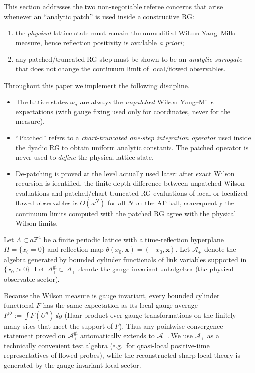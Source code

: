 \label{sec:patching}

This section addresses the two non-negotiable referee concerns that arise whenever an ``analytic patch'' is used inside a constructive RG:
\begin{enumerate}[label=(\roman*)]
\item the \emph{physical} lattice state must remain the unmodified Wilson Yang--Mills measure, hence reflection positivity is available \emph{a priori};
\item any patched/truncated RG step must be shown to be an \emph{analytic surrogate} that does not change the continuum limit of local/flowed observables.
\end{enumerate}

Throughout this paper we implement the following discipline.

\begin{itemize}
\item The lattice states $\omega_a$ are always the \emph{unpatched} Wilson Yang--Mills expectations (with gauge fixing used only for coordinates, never for the measure).
\item ``Patched'' refers to a \emph{chart-truncated one-step integration operator} used inside the dyadic RG to obtain uniform analytic constants.
The patched operator is never used to \emph{define} the physical lattice state.
\item De-patching is proved at the level actually used later: after exact Wilson recursion is identified, the finite-depth difference between unpatched Wilson evaluations and patched/chart-truncated RG evaluations of local or localized flowed observables is $O(u^N)$ for all $N$ on the AF ball; consequently the continuum limits computed with the patched RG agree with the physical Wilson limits.
\end{itemize}

Let $\Lambda\subset a\mathbb Z^4$ be a finite periodic lattice with a time-reflection hyperplane $\Pi=\{x_0=0\}$ and reflection map
$\theta(x_0,\mathbf x)=(-x_0,\mathbf x)$.
Let $\mathcal A_+$ denote the algebra generated by bounded cylinder functionals of link variables supported in $\{x_0>0\}$.
Let $\mathcal A^{\mathrm{gi}}_+\subset\mathcal A_+$ denote the gauge-invariant subalgebra (the physical observable sector).

\begin{remark}
Because the Wilson measure is gauge invariant, every bounded cylinder functional $F$ has the same expectation as its local gauge-average
$F^{\mathrm{gi}}:=\int F(U^g)\,dg$ (Haar product over gauge transformations on the finitely many sites that meet the support of $F$).
Thus any pointwise convergence statement proved on $\mathcal A^{\mathrm{gi}}_+$ automatically extends to $\mathcal A_+$.
We use $\mathcal A_+$ as a technically convenient test algebra (e.g.\ for quasi-local positive-time representatives of flowed probes),
while the reconstructed sharp local theory is generated by the gauge-invariant local sector.
\end{remark}

